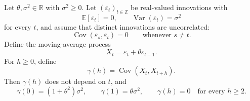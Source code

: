 \begin{theorem}
Let $\theta,\sigma^2\in\mathbb{R}$ with $\sigma^2\ge 0$. Let
$(\varepsilon_t)_{t\in\mathbb{Z}}$ be real-valued innovations with
\[
\mathbb{E}[\varepsilon_t]=0,
\qquad
\operatorname{Var}(\varepsilon_t)=\sigma^2
\]
for every $t$, and assume that distinct innovations are uncorrelated:
\[
\operatorname{Cov}(\varepsilon_s,\varepsilon_t)=0
\qquad
\text{whenever }s\ne t.
\]
Define the moving-average process
\[
X_t=\varepsilon_t+\theta\varepsilon_{t-1}.
\]
For $h\ge 0$, define
\[
\gamma(h)=\operatorname{Cov}(X_t,X_{t+h}).
\]
Then $\gamma(h)$ does not depend on $t$, and
\[
\gamma(0)=(1+\theta^2)\sigma^2,
\qquad
\gamma(1)=\theta\sigma^2,
\qquad
\gamma(h)=0\quad\text{for every }h\ge 2.
\]
\end{theorem}
